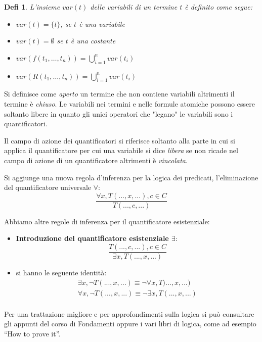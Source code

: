 \documentclass[a4paper]{book}
\newtheorem*{defi}{Defi}%
\begin{document}
\begin{defi}
    L'insieme $var(t)$ delle variabili di un termine $t$ è definito come segue:
    \begin{itemize}
        \item $var(t) = \{t \}$, se $t$ è una variabile
        \item $var(t) = \emptyset$ se $t$ è una costante
        \item $var(f(t_1,\dots,t_n)) = \bigcup _{i = 1} ^n var(t_i)$
        \item $var(R(t_1,\dots,t_n)) = \bigcup _{i = 1} ^ n var(t_i)$
    \end{itemize}
\end{defi}
Si definisce come \emph{aperto} un termine che non contiene variabili altrimenti il termine è \emph{chiuso}.\newline
Le variabili nei termini e nelle formule atomiche possono essere soltanto libere
in quanto gli unici operatori che "legano" le variabili sono i quantificatori.

Il campo di azione dei quantificatori si riferisce soltanto alla parte in cui si applica il quantificatore per cui
una variabile si dice \emph{libera} se non ricade nel campo di azione di un quantificatore altrimenti è \emph{vincolata}.

Si aggiunge una nuova regola d'inferenza per la logica dei predicati, l'eliminazione del quantificatore universale $\forall$:
\begin{equation*}
  \frac{\forall x, T(...,x,...), c\in C}{T(...,c,...)}
\end{equation*}

Abbiamo altre regole di inferenza per il quantificatore esistenziale:
\begin{itemize}
\item \textbf{Introduzione del quantificatore esistenziale $\exists$}:
  \begin{equation*}
    \frac{T(...,c,...), c\in C}{\exists x, T(...,x,...)}
  \end{equation*}
\item si hanno le seguente identità:
  \begin{equation*}
    \begin{split}
      \exists x, \neg T(...,x,...)\equiv \neg\forall x, T)...,x,...) \\
      \forall x, \neg T(...,x,...)\equiv \neg\exists x, T(...,x,...)\\
    \end{split}
  \end{equation*}
\end{itemize}
Per una trattazione migliore e per approfondimenti sulla logica si può consultare gli appunti del corso di Fondamenti oppure i vari libri di
logica, come ad esempio ``How to prove it''.
\end{document}
